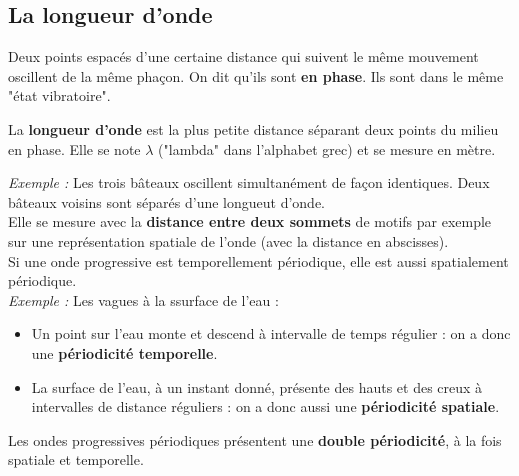 \documentclass[a4paper,11pt,fleqn]{scrartcl}%
\begin{document}
    \subsection{La longueur d'onde}
    Deux points espacés d'une certaine distance qui suivent le même mouvement oscillent de la même phaçon. On dit qu'ils sont \textbf{en phase}. Ils sont dans le même "état vibratoire".
    \begin{cours}
        La \textbf{longueur d'onde} est la plus petite distance séparant deux points du milieu en phase. Elle se note $\lambda$ ("lambda" dans l'alphabet grec) et se mesure en mètre.
    \end{cours}
    \emph{Exemple : } Les trois bâteaux oscillent simultanément de façon identiques. Deux bâteaux voisins sont séparés d'une longueut d'onde.\\
Elle se mesure avec la \textbf{distance entre deux sommets} de motifs par exemple sur une représentation spatiale de l'onde (avec la distance en abscisses).\\
Si une onde progressive est temporellement périodique, elle est aussi spatialement périodique.\\
\emph{Exemple : } Les vagues à la ssurface de l'eau : 
\begin{itemize}
    \item Un point sur l'eau monte et descend à intervalle de temps régulier : on a donc une \textbf{périodicité temporelle}.
    \item La surface de l'eau, à un instant donné, présente des hauts et des creux à intervalles de distance réguliers : on a donc aussi une \textbf{périodicité spatiale}.
\end{itemize}

\begin{cours}
    Les ondes progressives périodiques présentent une \textbf{double périodicité}, à la fois spatiale et temporelle.
\end{cours}
\end{document}
